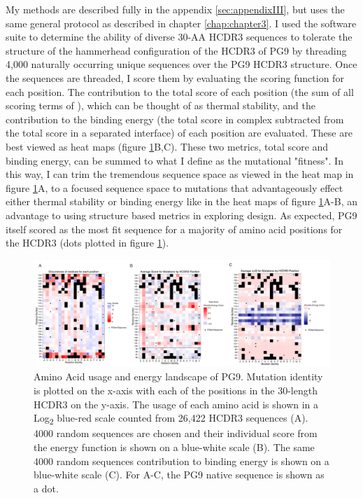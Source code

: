 My methods are described fully in the appendix \ref{sec:appendixIII}, but uses the same general protocol as described in chapter \ref{chap:chapter3}. I used the software suite \rosetta to determine the ability of diverse 30-AA HCDR3 sequences to tolerate the structure of the hammerhead configuration of the HCDR3 of PG9 by threading 4,000 naturally occurring unique sequences over the PG9 HCDR3 structure. Once the sequences are threaded, I score them by evaluating the \rosetta scoring function for each position. The contribution to the total score of each position (the sum of all scoring terms of \rosetta), which can be thought of as thermal stability, and the contribution to the binding energy (the total score in complex subtracted from the total score in a separated interface) of each position are evaluated. These are best viewed as heat maps (figure \ref{fig:figure4_2}B,C). These two metrics, total score and binding energy, can be summed to what I define as the mutational "fitness". In this way, I can trim the tremendous sequence space as viewed in the heat map in figure \ref{fig:figure4_2}A, to a focused sequence space to mutations that advantageously effect either thermal stability or binding energy like in the heat maps of figure \ref{fig:figure4_2}A-B, an advantage to using structure based metrics in exploring design. As expected, PG9 itself scored as the most fit sequence for a majority of amino acid positions for the HCDR3 (dots plotted in figure \ref{fig:figure4_2}).

\begin{figure}
   \centering
   \includegraphics[width=.99\textwidth]{images/chapter4/figure4_2.pdf} %
   \caption[Amino Acid Usage and Energy Landscape of PG9]{Amino Acid usage and energy landscape of PG9. Mutation identity is plotted on the x-axis with each of the positions in the 30-length HCDR3 on the y-axis. The usage of each amino acid is shown in a Log\textsubscript{2} blue-red scale counted from 26,422 HCDR3 sequences (A). 4000 random sequences are chosen and their individual score from the \rosetta energy function is shown on a blue-white scale (B).  The same 4000 random sequences contribution to binding energy is shown on a blue-white scale (C). For A-C, the PG9 native sequence is shown as a dot.
}
   \label{fig:figure4_2}
\end{figure}

